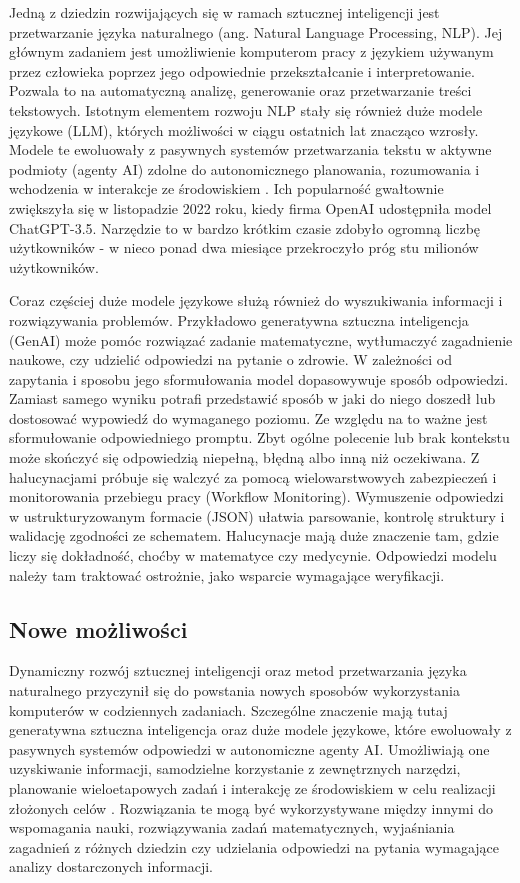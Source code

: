 Jedną z dziedzin rozwijających się w ramach sztucznej inteligencji jest przetwarzanie języka naturalnego (ang. Natural Language Processing, NLP). Jej głównym zadaniem jest umożliwienie komputerom pracy z językiem używanym przez człowieka poprzez jego odpowiednie przekształcanie i interpretowanie. Pozwala to na automatyczną analizę, generowanie oraz przetwarzanie treści tekstowych. Istotnym elementem rozwoju NLP stały się również duże modele językowe (LLM), których możliwości w ciągu ostatnich lat znacząco wzrosły. Modele te ewoluowały z pasywnych systemów przetwarzania tekstu w aktywne podmioty (agenty AI) zdolne do autonomicznego planowania, rozumowania i wchodzenia w interakcje ze środowiskiem \cite{llm_mas_techniques_and_business}. Ich popularność gwałtownie zwiększyła się w listopadzie 2022 roku, kiedy firma OpenAI udostępniła model ChatGPT-3.5. Narzędzie to w bardzo krótkim czasie zdobyło ogromną liczbę użytkowników - w nieco ponad dwa miesiące przekroczyło próg stu milionów użytkowników.

Coraz częściej duże modele językowe służą również do wyszukiwania informacji i rozwiązywania problemów. Przykładowo generatywna sztuczna inteligencja (GenAI)  może pomóc rozwiązać zadanie matematyczne, wytłumaczyć zagadnienie naukowe, czy udzielić odpowiedzi na pytanie o zdrowie. W zależności od zapytania i sposobu jego sformułowania model dopasowywuje sposób odpowiedzi. Zamiast samego wyniku potrafi przedstawić sposób w jaki do niego doszedł lub dostosować wypowiedź do wymaganego poziomu. Ze względu na to ważne jest sformułowanie odpowiedniego promptu. Zbyt ogólne polecenie lub brak kontekstu może skończyć się odpowiedzią niepełną, błędną albo inną niż oczekiwana. Z halucynacjami próbuje się walczyć za pomocą wielowarstwowych zabezpieczeń i monitorowania przebiegu pracy (Workflow Monitoring). Wymuszenie odpowiedzi w ustrukturyzowanym formacie (JSON) ułatwia parsowanie, kontrolę struktury i walidację zgodności ze schematem\cite{hierarchical_workflow}. Halucynacje mają duże znaczenie tam, gdzie liczy się dokładność, choćby w matematyce czy medycynie. Odpowiedzi modelu należy tam traktować ostrożnie, jako wsparcie wymagające weryfikacji. 

\subsection{Nowe możliwości}

Dynamiczny rozwój sztucznej inteligencji oraz metod przetwarzania języka naturalnego przyczynił się do powstania nowych sposobów wykorzystania komputerów w codziennych zadaniach. Szczególne znaczenie mają tutaj generatywna sztuczna inteligencja oraz duże modele językowe, które ewoluowały z pasywnych systemów odpowiedzi w autonomiczne agenty AI. Umożliwiają one uzyskiwanie informacji, samodzielne korzystanie z zewnętrznych narzędzi, planowanie wieloetapowych zadań i interakcję ze środowiskiem w celu realizacji złożonych celów \cite{ma_collaboration}. Rozwiązania te mogą być wykorzystywane między innymi do wspomagania nauki, rozwiązywania zadań matematycznych, wyjaśniania zagadnień z różnych dziedzin czy udzielania odpowiedzi na pytania wymagające analizy dostarczonych informacji.

